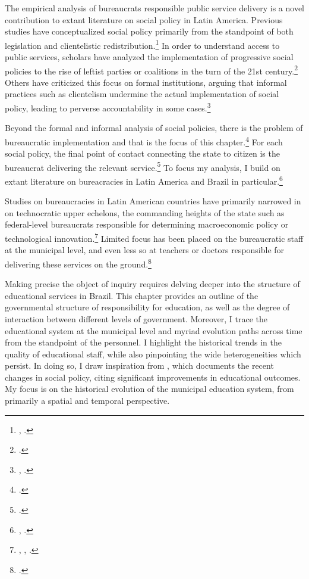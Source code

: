 \documentclass[12pt,]{book}
\let\rmarkdownfootnote\footnote%
\def\footnote{\protect\rmarkdownfootnote}
\begin{document}
The empirical analysis of bureaucrats responsible public service delivery is a novel contribution to extant literature on social policy in Latin America. Previous studies have conceptualized social policy primarily from the standpoint of both legislation and clientelistic redistribution.\footnote{\citet{kaufman_globalization_2001}, \citet{diaz-cayeros_political_2017}.} In order to understand access to public services, scholars have analyzed the implementation of progressive social policies to the rise of leftist parties or coalitions in the turn of the 21st century.\footnote{\citet{haggard_development_2008}.} Others have criticized this focus on formal institutions, arguing that informal practices such as clientelism undermine the actual implementation of social policy, leading to perverse accountability in some cases.\footnote{\citet{ross_democracy_2006}, \citet{stokes_perverse_2005}.}

Beyond the formal and informal analysis of social policies, there is the problem of bureaucratic implementation and that is the focus of this chapter.\footnote{\citet{pepinsky_bureaucracy_1997}.} For each social policy, the final point of contact connecting the state to citizen is the bureaucrat delivering the relevant service.\footnote{\citet{lipsky_street-level_1985}.} To focus my analysis, I build on extant literature on bureacracies in Latin America and Brazil in particular.\footnote{\citet{grindle_jobs_2012}, \citet{geddes_politicians_1994}.}

Studies on bureaucracies in Latin American countries have primarily narrowed in on technocratic upper echelons, the commanding heights of the state such as federal-level bureaucrats responsible for determining macroeconomic policy or technological innovation.\footnote{\citet{bersch_state_2017}, \citet{kohli_state-directed_2004}, \citet{evans_embedded_1995}.} Limited focus has been placed on the bureaucratic staff at the municipal level, and even less so at teachers or doctors responsible for delivering these services on the ground.\footnote{\citet{gatti_professores_2009}.}

Making precise the object of inquiry requires delving deeper into the structure of educational services in Brazil. This chapter provides an outline of the governmental structure of responsibility for education, as well as the degree of interaction between different levels of government. Moreover, I trace the educational system at the municipal level and myriad evolution paths across time from the standpoint of the personnel. I highlight the historical trends in the quality of educational staff, while also pinpointing the wide heterogeneities which persist. In doing so, I draw inspiration from \citet{arretche_trajetorias_2015}, which documents the recent changes in social policy, citing significant improvements in educational outcomes. My focus is on the historical evolution of the municipal education system, from primarily a spatial and temporal perspective.
\end{document}
